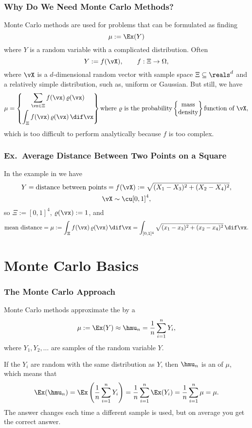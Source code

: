 \documentclass[10pt,compress,xcolor={usenames,dvipsnames}]{beamer} %
\begin{document}
\begin{frame}
\frametitle{Why Do We Need Monte Carlo Methods?}

Monte Carlo methods are used for problems that can be formulated as finding 
\[
\mu := \Ex(Y)
\]
where $Y$ is a random variable with a \alert{complicated distribution}.  Often 
\[
Y :=f(\vX), \qquad f: \Xi \to \Omega,
\]
where $\vX$ is a $d$-dimensional random vector with sample space $\Xi \subseteq \reals^d$ and a relatively simple distribution, such as, uniform or Gaussian.  But still, we have
\begin{equation*}
\mu = \begin{Bmatrix}\displaystyle
\sum_{\vx \in \Xi} f(\vx) \, \varrho(\vx) \\[3ex]
\displaystyle
\int_{\Xi} f(\vx)\, \varrho(\vx) \, \dif \vx
\end{Bmatrix}
\text{where } \varrho \text{ is the probability}
\begin{Bmatrix}
\text{mass} \\
\text{density}
\end{Bmatrix}
\text{function of }\vX,
\end{equation*}
which is too difficult to perform analytically because $f$ is too complex.

\end{frame}

\begin{frame}
\frametitle{Ex.\ Average Distance Between Two Points on a Square}
In the example in   we have
\begin{multline*}
Y = \text{distance between points} = f(\vX) := \sqrt{(X_1-X_3)^2 + (X_2-X_4)^2}, \\ \vX \sim \cu[0,1]^4,
\end{multline*}
so $\Xi := [0,1]^4$, $\varrho(\vx):=1$, and 
\[
\text{mean distance} = \mu := \int_{\Xi} f(\vx)\, \varrho(\vx) \, \dif \vx = \int_{[0,1]^4} \sqrt{(x_1-x_3)^2 + (x_2-x_4)^2}\,  \dif \vx.
\]
\end{frame}


\section{Monte Carlo Basics}
\begin{frame}
\frametitle{The Monte Carlo Approach}
Monte Carlo methods approximate the  by a  
\[
\mu := \Ex(Y) \approx \hmu_n = \frac{1}{n} \sum_{i=1}^n Y_i,
\]
where $Y_1, Y_2, \ldots$ are \alert{samples} of the random variable $Y$.

If the $Y_i$ are random with the same distribution as $Y$, then $\hmu_n$ is an  of $\mu$, which means that
\[
\Ex(\hmu_n) = \Ex\left(\frac{1}{n} \sum_{i=1}^n Y_i \right) =  \frac{1}{n} \sum_{i=1}^n \Ex(Y_i)= \frac{1}{n} \sum_{i=1}^n \mu = \mu.
\]
The answer changes each time a different sample is used, but on average you get the correct answer.

\end{frame}
\end{document}
